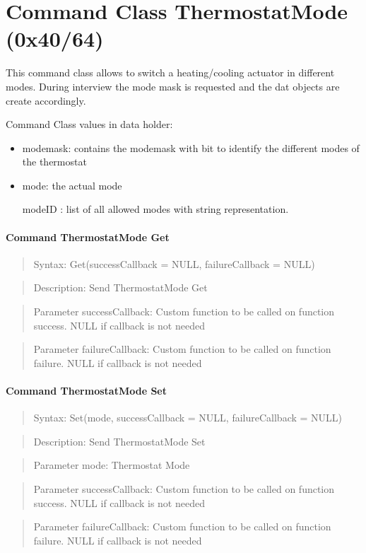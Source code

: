  
\section{Command Class ThermostatMode (0x40/64)}

This command class allows to switch a heating/cooling actuator in different modes. During interview the mode mask
is requested and the dat objects are create accordingly.

Command Class values in data holder:
\begin{itemize}
\item modemask: contains the modemask with bit to identify the different modes of the thermostat
\item mode: the actual mode
\item [modeID]:  list of all allowed modes with string representation.
\end{itemize}

\paragraph {Command ThermostatMode Get}
\begin{quote} Syntax: Get(successCallback = NULL, failureCallback = NULL)\end{quote}
\begin{quote} Description: Send ThermostatMode Get\end{quote}
\begin{quote} Parameter successCallback: Custom function to be called on function success. NULL if callback is not needed\end{quote}
\begin{quote} Parameter failureCallback: Custom function to be called on function failure. NULL if callback is not needed\end{quote}

\paragraph {Command ThermostatMode Set}
\begin{quote} Syntax: Set(mode, successCallback = NULL, failureCallback = NULL)\end{quote}
\begin{quote} Description: Send ThermostatMode Set\end{quote}
\begin{quote} Parameter mode: Thermostat Mode\end{quote}
\begin{quote} Parameter successCallback: Custom function to be called on function success. NULL if callback is not needed\end{quote}
\begin{quote} Parameter failureCallback: Custom function to be called on function failure. NULL if callback is not needed\end{quote}


